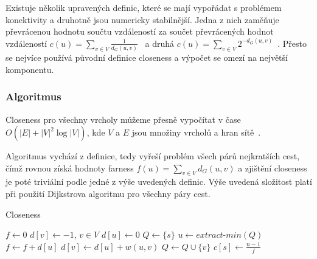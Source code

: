 \documentclass{bakalarka}
\begin{document}
Existuje několik upravených definic, které se mají vypořádat s problémem
konektivity a druhotně jsou numericky stabilnější. Jedna z nich zaměňuje
převrácenou hodnotu součtu vzdáleností za součet převrácených hodnot
vzdáleností $c(u) = \sum_{v \in V} \frac{1}{d_G(u, v)}$~\citep{opsahl} a druhá
$c(u) = \sum_{v \in V} 2^{-d_G(u, v)}$~\citep{dangalchev2006}. Přesto se
nejvíce používá původní definice closeness a výpočet se omezí na největší
komponentu.


\subsubsection{Algoritmus}
Closeness pro všechny vrcholy můžeme přesně vypočítat v čase $O(|E| +
|V|^2\log|V|)$, kde $V$ a $E$ jsou množiny vrcholů a hran
sítě~\citep{fredmantarjan}.

Algoritmus vychází z definice, tedy vyřeší problém všech párů nejkratších cest,
čímž rovnou získá hodnoty farness $f(u) = \sum_{v \in V} d_G(u, v)$ a zjištění
closeness je poté triviální podle jedné z výše uvedených definic. Výše uvedená
složitost platí při použití Dijkstrova algoritmu pro všechny páry cest.

\begin{center}
\begin{minipage}{\textwidth}
\begin{algorithm}[H]
	\caption{Closeness}
		\label{alg:closeness}

	\begin{algorithmic}[1]
	\Statex
		\State $f \gets 0$
		\State $d[v] \gets -1$, $v \in V$
		\State $d[u] \gets 0$
		\State $Q \gets \{s\}$
			\State $u \gets extract\mbox{-}min(Q)$
			\State $f \gets f + d[u]$
					\State $d[v] \gets d[u] + w(u, v)$
					\State $Q \gets Q \cup \{v\}$
				\EndIf
			\EndFor
		\EndWhile
		\State $c[s] \gets \frac{n - 1}{f}$
	\EndFor
	\end{algorithmic}
\end{algorithm}
\end{minipage}
\end{center}
\mbox{}
\end{document}
